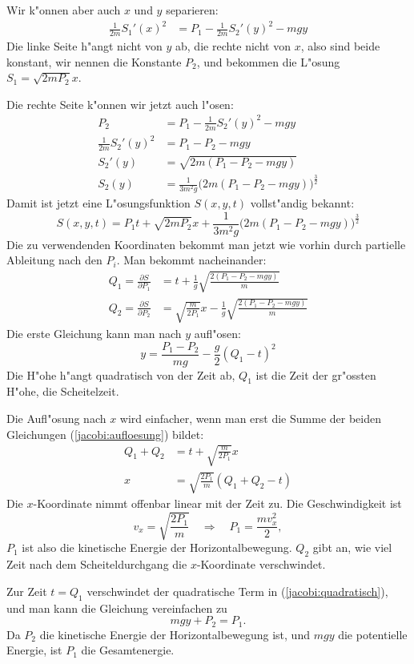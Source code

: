 Wir k"onnen aber auch $x$ und $y$ separieren:
\begin{align*}
\frac1{2m}S_1'(x)^2&=P_1-\frac1{2m}S_2'(y)^2-mgy
\end{align*}
Die linke Seite h"angt nicht von $y$ ab, die rechte nicht von $x$, also sind
beide konstant, wir nennen die Konstante $P_2$, und bekommen
die L"osung $S_1=\sqrt{2mP_2} x$.

Die rechte Seite k"onnen wir jetzt auch l"osen:
\begin{align*}
P_2&=
P_1-\frac1{2m}S_2'(y)^2-mgy
\\
\frac1{2m}S_2'(y)^2
&=
P_1-P_2-mgy
\\
S_2'(y)&=\sqrt{
2m(P_1-P_2-mgy)
}
\\
S_2(y)
&=
\frac1{3m^2g}\bigl(2m(P_1-P_2-mgy)\bigr)^{\frac32}
\end{align*}
Damit ist jetzt eine L"osungsfunktion $S(x,y,t)$ vollst"andig
bekannt:
\[
S(x,y,t)=P_1t+\sqrt{2mP_2}x +
\frac1{3m^2g}\bigl(2m(P_1-P_2-mgy)\bigr)^{\frac32}
\]
Die zu verwendenden Koordinaten bekommt man jetzt wie vorhin durch
partielle Ableitung nach den $P_i$. Man bekommt nacheinander:
\begin{equation}
\begin{aligned}
Q_1=\frac{\partial S}{\partial P_1}
&=
t+
\frac1{g}\sqrt{\frac{2(P_1-P_2-mgy)}{m}}
\\
Q_2=\frac{\partial S}{\partial P_2}
&=
\sqrt{\frac{m}{2P_1}}x
-
\frac1{g}\sqrt{\frac{2(P_1-P_2-mgy)}{m}}
\end{aligned}
\label{jacobi:aufloesung}
\end{equation}
Die erste Gleichung kann man nach $y$ aufl"osen:
\begin{equation}
y=
\frac{P_1-P_2}{mg}-\frac{g}{2}(Q_1-t)^2
\label{jacobi:quadratisch}
\end{equation}
Die H"ohe h"angt quadratisch von der Zeit ab, $Q_1$ ist die Zeit
der gr"ossten H"ohe, die Scheitelzeit.

Die Aufl"osung nach $x$ wird einfacher, wenn man erst die Summe der beiden
Gleichungen (\ref{jacobi:aufloesung}) bildet:
\begin{align*}
Q_1+Q_2&=t+\sqrt{\frac{m}{2P_1}}x\\
x&=\sqrt{\frac{2P_1}{m}}(Q_1+Q_2-t)
\end{align*}
Die $x$-Koordinate nimmt offenbar linear mit der Zeit zu. Die
Geschwindigkeit ist
\[
v_x=\sqrt{\frac{2P_1}{m}}\quad\Rightarrow\quad P_1=\frac{mv_x^2}2,
\]
$P_1$ ist also die kinetische Energie der Horizontalbewegung.
$Q_2$ gibt an, wie viel Zeit nach dem Scheiteldurchgang die $x$-Koordinate
verschwindet.

Zur Zeit $t=Q_1$ verschwindet der quadratische Term in
(\ref{jacobi:quadratisch}), und man kann die Gleichung vereinfachen
zu 
\[
mgy + P_2=P_1.
\]
Da $P_2$ die kinetische Energie der Horizontalbewegung ist, und $mgy$
die potentielle Energie, ist $P_1$ die Gesamtenergie.

